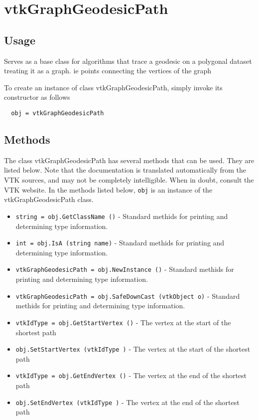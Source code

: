 \section{vtkGraphGeodesicPath}

\subsection{Usage}

 Serves as a base class for algorithms that trace a geodesic on a 
 polygonal dataset treating it as a graph. ie points connecting the 
 vertices of the graph

To create an instance of class vtkGraphGeodesicPath, simply
invoke its constructor as follows
\begin{verbatim}
  obj = vtkGraphGeodesicPath
\end{verbatim}
\subsection{Methods}

The class vtkGraphGeodesicPath has several methods that can be used.
  They are listed below.
Note that the documentation is translated automatically from the VTK sources,
and may not be completely intelligible.  When in doubt, consult the VTK website.
In the methods listed below, \verb|obj| is an instance of the vtkGraphGeodesicPath class.
\begin{itemize}
\item  \verb|string = obj.GetClassName ()| -  Standard methids for printing and determining type information.

\item  \verb|int = obj.IsA (string name)| -  Standard methids for printing and determining type information.

\item  \verb|vtkGraphGeodesicPath = obj.NewInstance ()| -  Standard methids for printing and determining type information.

\item  \verb|vtkGraphGeodesicPath = obj.SafeDownCast (vtkObject o)| -  Standard methids for printing and determining type information.

\item  \verb|vtkIdType = obj.GetStartVertex ()| -  The vertex at the start of the shortest path

\item  \verb|obj.SetStartVertex (vtkIdType )| -  The vertex at the start of the shortest path

\item  \verb|vtkIdType = obj.GetEndVertex ()| -  The vertex at the end of the shortest path

\item  \verb|obj.SetEndVertex (vtkIdType )| -  The vertex at the end of the shortest path

\end{itemize}
